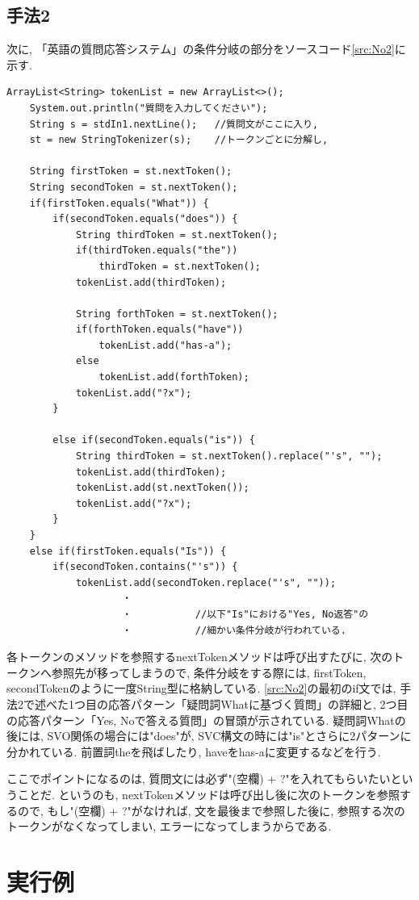\documentclass[uplatex,12pt]{jsarticle}
\begin{document}
\subsection{手法2}
次に, 「英語の質問応答システム」の条件分岐の部分をソースコード\ref{src:No2}に示す.
\begin{lstlisting}[caption=英語における質問応答, label=src:No2]
	ArrayList<String> tokenList = new ArrayList<>();
	System.out.println("質問を入力してください");
	String s = stdIn1.nextLine(); 	//質問文がここに入り,
	st = new StringTokenizer(s);	//トークンごとに分解し,

	String firstToken = st.nextToken();
	String secondToken = st.nextToken();
	if(firstToken.equals("What")) {
		if(secondToken.equals("does")) {
			String thirdToken = st.nextToken();
			if(thirdToken.equals("the")) 
				thirdToken = st.nextToken();
			tokenList.add(thirdToken);
	
			String forthToken = st.nextToken();
			if(forthToken.equals("have"))
				tokenList.add("has-a");
			else
				tokenList.add(forthToken);
			tokenList.add("?x");
		}
	
		else if(secondToken.equals("is")) {
			String thirdToken = st.nextToken().replace("'s", "");
			tokenList.add(thirdToken);
			tokenList.add(st.nextToken());
			tokenList.add("?x");
		}
	}
	else if(firstToken.equals("Is")) {
		if(secondToken.contains("'s")) {
			tokenList.add(secondToken.replace("'s", ""));
					・
					・	   		//以下"Is"における"Yes, No返答"の
					・			//細かい条件分岐が行われている.

\end{lstlisting}

各トークンのメソッドを参照するnextTokenメソッドは呼び出すたびに, 次のトークンへ参照先が移ってしまうので, 条件分岐をする際には, firstToken, secondTokenのように一度String型に格納している. \ref{src:No2}の最初のif文では, 手法2で述べた1つ目の応答パターン「疑問詞Whatに基づく質問」の詳細と, 2つ目の応答パターン「Yes, Noで答える質問」の冒頭が示されている. 疑問詞Whatの後には, SVO関係の場合には"does"が, SVC構文の時には"is"とさらに2パターンに分かれている. 前置詞theを飛ばしたり, haveをhas-aに変更するなどを行う. 

ここでポイントになるのは, 質問文には必ず"(空欄) + ?"を入れてもらいたいということだ. というのも, nextTokenメソッドは呼び出し後に次のトークンを参照するので, もし"(空欄) + ?"がなければ, 文を最後まで参照した後に, 参照する次のトークンがなくなってしまい, エラーになってしまうからである.

\section{実行例}
\end{document}
